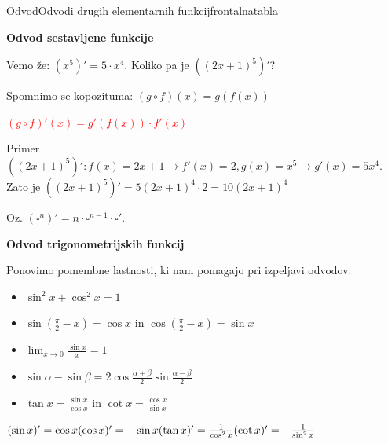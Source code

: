 \begin{priprava}{}{}{Odvod}{Odvodi drugih elementarnih funkcij}{frontalna}{tabla}


\textbf{Odvod sestavljene funkcije}

Vemo že: $ (x^5)' = 5 \cdot x^4 $. Koliko pa je $ ((2x + 1)^5)' $?

Spomnimo se kopozituma: $ (g \circ f)(x) = g(f(x)) $

\textcolor{red}{$ (g \circ f)'(x) = g'(f(x)) \cdot f'(x) $} 

Primer $ ((2x + 1)^5)': f(x) = 2x + 1 \rightarrow f'(x) = 2, g(x) = x^5 \rightarrow g'(x) = 5 x^4 $. Zato je $ ((2x + 1)^5)' = 5 (2x + 1)^4 \cdot 2 = 10 (2x + 1)^4 $

Oz. $ (\square ^n)' = n \cdot \square^{n - 1} \cdot \square' $.


\textbf{Odvod trigonometrijskih funkcij}

Ponovimo pomembne lastnosti, ki nam pomagajo pri izpeljavi odvodov:
\begin{itemize}
    \item $ \sin^2 x + \cos^2 x = 1 $
    \item $ \sin(\frac{\pi}{2} - x) = \cos x $ in $ \cos(\frac{\pi}{2} - x) = \sin x $
    \item $ \lim_{x \to 0} \frac{\sin x}{x} = 1 $
    \item $ \sin \alpha - \sin \beta = 2 \cos \frac{\alpha + \beta}{2} \sin \frac{\alpha - \beta}{2} $
    \item $ \tan x = \frac{\sin x}{\cos x} $ in $ \cot x = \frac{\cos x}{\sin x} $
\end{itemize}


\textcolor{red}{
    $ (\sin x)' = \cos x \\ (\cos x)' = - \sin x \\ (\tan x)' = \frac{1}{\cos^2 x} \\ (\cot x)' = - \frac{1}{\sin^2 x} $
}


\end{priprava}
